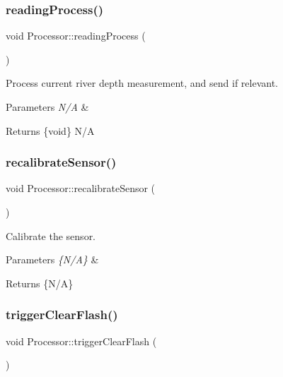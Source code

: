 \subsubsection{\texorpdfstring{reading\+Process()}{readingProcess()}}
{\footnotesize\ttfamily void Processor\+::reading\+Process (\begin{DoxyParamCaption}{ }\end{DoxyParamCaption})}

Process current river depth measurement, and send if relevant. 
\begin{DoxyParams}{Parameters}
{\em N/A} & \\
\hline
\end{DoxyParams}
\begin{DoxyReturn}{Returns}
\{void\} N/A 
\end{DoxyReturn}
\mbox{\label{class_processor_ae18acf2c55d0a3bcd7412f86d388808d}} 
\subsubsection{\texorpdfstring{recalibrate\+Sensor()}{recalibrateSensor()}}
{\footnotesize\ttfamily void Processor\+::recalibrate\+Sensor (\begin{DoxyParamCaption}{ }\end{DoxyParamCaption})}

Calibrate the sensor. 
\begin{DoxyParams}{Parameters}
{\em \{\+N/\+A\}} & \\
\hline
\end{DoxyParams}
\begin{DoxyReturn}{Returns}
\{N/A\} 
\end{DoxyReturn}
\mbox{\label{class_processor_a8083069e032fcd6e38c97cc31475200a}} 
\subsubsection{\texorpdfstring{trigger\+Clear\+Flash()}{triggerClearFlash()}}
{\footnotesize\ttfamily void Processor\+::trigger\+Clear\+Flash (\begin{DoxyParamCaption}{ }\end{DoxyParamCaption})}

